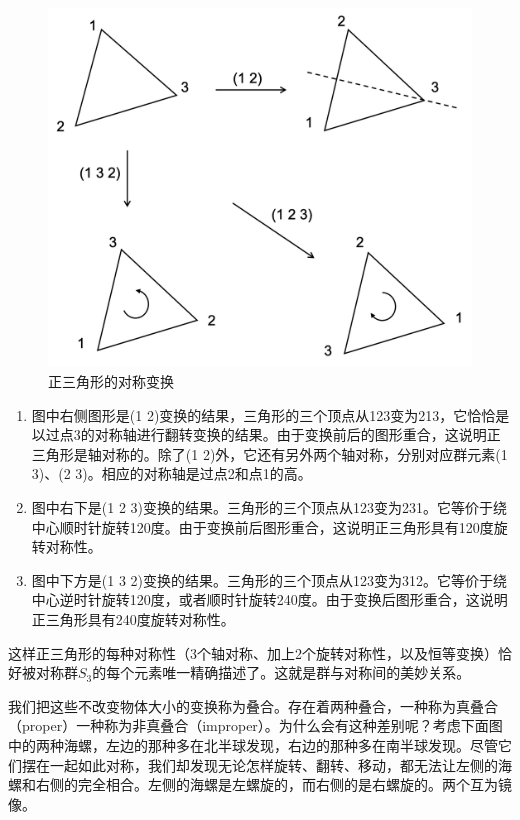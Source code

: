 \documentclass[b5paper]{ctexart}
\begin{document}
\begin{figure}[htbp]
 \centering
 \includegraphics[scale=0.4]{img/s3-examples.png}
 \caption{正三角形的对称变换}
 \label{fig:S3-examples}
\end{figure}

\begin{enumerate}
\item 图中右侧图形是(1 2)变换的结果，三角形的三个顶点从123变为213，它恰恰是以过点3的对称轴进行翻转变换的结果。由于变换前后的图形重合，这说明正三角形是轴对称的。除了(1 2)外，它还有另外两个轴对称，分别对应群元素(1 3)、(2 3)。相应的对称轴是过点2和点1的高。

\item 图中右下是(1 2 3)变换的结果。三角形的三个顶点从123变为231。它等价于绕中心顺时针旋转120度。由于变换前后图形重合，这说明正三角形具有120度旋转对称性。

\item 图中下方是(1 3 2)变换的结果。三角形的三个顶点从123变为312。它等价于绕中心逆时针旋转120度，或者顺时针旋转240度。由于变换后图形重合，这说明正三角形具有240度旋转对称性。
\end{enumerate}

这样正三角形的每种对称性（3个轴对称、加上2个旋转对称性，以及恒等变换）恰好被对称群$S_3$的每个元素唯一精确描述了。这就是群与对称间的美妙关系。

我们把这些不改变物体大小的变换称为叠合。存在着两种叠合，一种称为真叠合（proper）一种称为非真叠合（improper）。为什么会有这种差别呢？考虑下面图中的两种海螺，左边的那种多在北半球发现，右边的那种多在南半球发现。尽管它们摆在一起如此对称，我们却发现无论怎样旋转、翻转、移动，都无法让左侧的海螺和右侧的完全相合。左侧的海螺是左螺旋的，而右侧的是右螺旋的。两个互为镜像。
\end{document}
